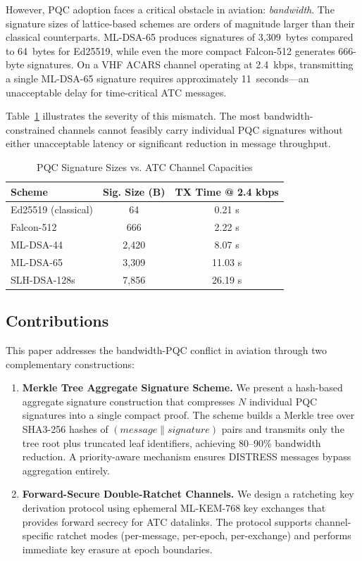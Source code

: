 \documentclass[conference,10pt]{IEEEtran}
\begin{document}
However, PQC adoption faces a critical obstacle in aviation: \emph{bandwidth}. The signature sizes of lattice-based schemes are orders of magnitude larger than their classical counterparts. ML-DSA-65 produces signatures of 3,309~bytes compared to 64~bytes for Ed25519, while even the more compact Falcon-512 generates 666-byte signatures. On a VHF ACARS channel operating at 2.4~kbps, transmitting a single ML-DSA-65 signature requires approximately 11~seconds---an unacceptable delay for time-critical ATC messages.

Table~\ref{tab:sig_comparison} illustrates the severity of this mismatch. The most bandwidth-constrained channels cannot feasibly carry individual PQC signatures without either unacceptable latency or significant reduction in message throughput.

\begin{table}[t]
\centering
\caption{PQC Signature Sizes vs. ATC Channel Capacities}
\label{tab:sig_comparison}
\begin{tabular}{lcc}
\toprule
\textbf{Scheme} & \textbf{Sig. Size (B)} & \textbf{TX Time @ 2.4 kbps} \\
\midrule
Ed25519 (classical) & 64 & 0.21 s \\
Falcon-512 & 666 & 2.22 s \\
ML-DSA-44 & 2,420 & 8.07 s \\
ML-DSA-65 & 3,309 & 11.03 s \\
SLH-DSA-128s & 7,856 & 26.19 s \\
\bottomrule
\end{tabular}
\end{table}

\subsection{Contributions}

This paper addresses the bandwidth-PQC conflict in aviation through two complementary constructions:

\begin{enumerate}
    \item \textbf{Merkle Tree Aggregate Signature Scheme.} We present a hash-based aggregate signature construction that compresses $N$ individual PQC signatures into a single compact proof. The scheme builds a Merkle tree over SHA3-256 hashes of $(message \| signature)$ pairs and transmits only the tree root plus truncated leaf identifiers, achieving 80--90\% bandwidth reduction. A priority-aware mechanism ensures DISTRESS messages bypass aggregation entirely.

    \item \textbf{Forward-Secure Double-Ratchet Channels.} We design a ratcheting key derivation protocol using ephemeral ML-KEM-768 key exchanges that provides forward secrecy for ATC datalinks. The protocol supports channel-specific ratchet modes (per-message, per-epoch, per-exchange) and performs immediate key erasure at epoch boundaries.
\end{enumerate}
\end{document}

